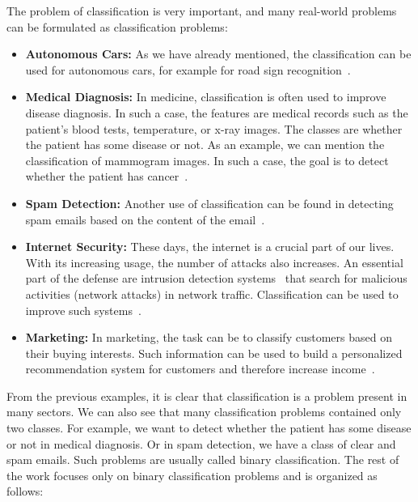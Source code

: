 The problem of classification is very important, and many real-world problems can be formulated as classification problems:
\begin{itemize}
  \item \textbf{Autonomous Cars:} As we have already mentioned, the classification can be used for autonomous cars, for example for road sign recognition~\cite{swaminathan2019autonomous}.
  \item \textbf{Medical Diagnosis:} In medicine, classification is often used to improve disease diagnosis. In such a case, the features are medical records such as the patient's blood tests, temperature, or x-ray images. The classes are whether the patient has some disease or not. As an example, we can mention the classification of mammogram images. In such a case, the goal is to detect whether the patient has cancer~\cite{viale2012current, levy2016breast}.
  \item \textbf{Spam Detection:} Another use of classification can be found in detecting spam emails based on the content of the email~\cite{pantel1998spamcop}.
  \item \textbf{Internet Security:} These days, the internet is a crucial part of our lives. With its increasing usage, the number of attacks also increases. An essential part of the defense are intrusion detection systems~\cite{grill2016learning, scarfone2007guide} that search for malicious activities (network attacks) in network traffic. Classification can be used to improve such systems~\cite{giacinto2002intrusion, shanbhag2009accurate}.
  \item \textbf{Marketing:} In marketing, the task can be to classify customers based on their buying interests. Such information can be used to build a personalized recommendation system for customers and therefore increase income~\cite{kaefer2005neural, zhang2007building}.
\end{itemize}
From the previous examples, it is clear that classification is a problem present in many sectors. We can also see that many classification problems contained only two classes. For example, we want to detect whether the patient has some disease or not in medical diagnosis. Or in spam detection, we have a class of clear and spam emails. Such problems are usually called binary classification. The rest of the work focuses only on binary classification problems and is organized as follows:
